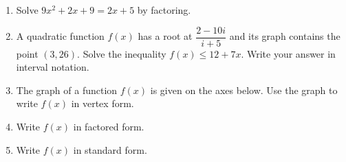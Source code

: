 \begin{enumerate}[leftmargin=*, label=\textbf{\arabic*.}, resume]
  \item Solve $9x^2 + 2x + 9 = 2x + 5$ by factoring. 
  \vgappp

  \item A quadratic function $f(x)$ has a root at $\dfrac{2-10i}{i+5}$ and its graph contains the point $(3,26)$. Solve the inequality $f(x) \leq 12 + 7x$. Write your answer in interval notation. 
  \vgappp

  \item The graph of a function $f(x)$ is given on the axes below. Use the graph to write $f(x)$ in vertex form. 

  \begin{center}
  \end{center}
  \vgap

  \item Write $f(x)$ in factored form. 
  \vgap

  \item Write $f(x)$ in standard form. 
  \vgapp

\end{enumerate}
